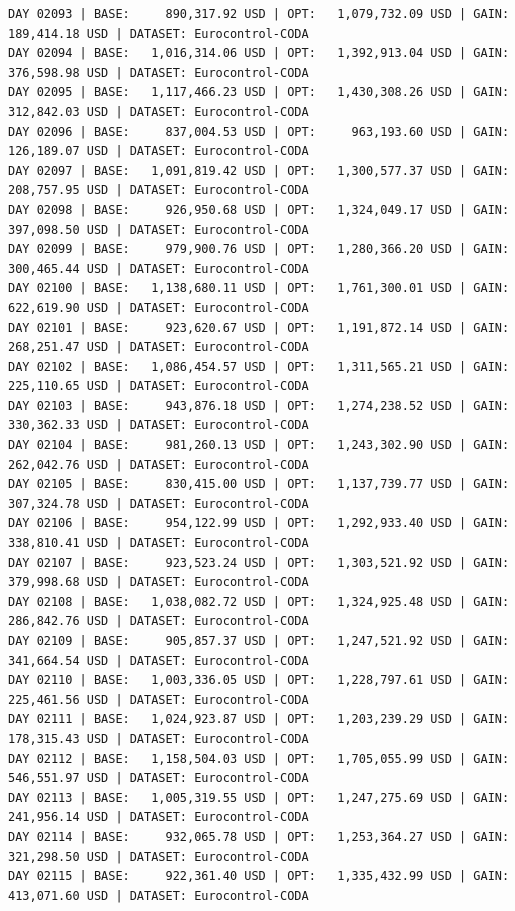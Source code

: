 \documentclass[11pt,a4paper]{article}
\begin{document}
\begin{verbatim}
DAY 02093 | BASE:     890,317.92 USD | OPT:   1,079,732.09 USD | GAIN: 189,414.18 USD | DATASET: Eurocontrol-CODA
DAY 02094 | BASE:   1,016,314.06 USD | OPT:   1,392,913.04 USD | GAIN: 376,598.98 USD | DATASET: Eurocontrol-CODA
DAY 02095 | BASE:   1,117,466.23 USD | OPT:   1,430,308.26 USD | GAIN: 312,842.03 USD | DATASET: Eurocontrol-CODA
DAY 02096 | BASE:     837,004.53 USD | OPT:     963,193.60 USD | GAIN: 126,189.07 USD | DATASET: Eurocontrol-CODA
DAY 02097 | BASE:   1,091,819.42 USD | OPT:   1,300,577.37 USD | GAIN: 208,757.95 USD | DATASET: Eurocontrol-CODA
DAY 02098 | BASE:     926,950.68 USD | OPT:   1,324,049.17 USD | GAIN: 397,098.50 USD | DATASET: Eurocontrol-CODA
DAY 02099 | BASE:     979,900.76 USD | OPT:   1,280,366.20 USD | GAIN: 300,465.44 USD | DATASET: Eurocontrol-CODA
DAY 02100 | BASE:   1,138,680.11 USD | OPT:   1,761,300.01 USD | GAIN: 622,619.90 USD | DATASET: Eurocontrol-CODA
DAY 02101 | BASE:     923,620.67 USD | OPT:   1,191,872.14 USD | GAIN: 268,251.47 USD | DATASET: Eurocontrol-CODA
DAY 02102 | BASE:   1,086,454.57 USD | OPT:   1,311,565.21 USD | GAIN: 225,110.65 USD | DATASET: Eurocontrol-CODA
DAY 02103 | BASE:     943,876.18 USD | OPT:   1,274,238.52 USD | GAIN: 330,362.33 USD | DATASET: Eurocontrol-CODA
DAY 02104 | BASE:     981,260.13 USD | OPT:   1,243,302.90 USD | GAIN: 262,042.76 USD | DATASET: Eurocontrol-CODA
DAY 02105 | BASE:     830,415.00 USD | OPT:   1,137,739.77 USD | GAIN: 307,324.78 USD | DATASET: Eurocontrol-CODA
DAY 02106 | BASE:     954,122.99 USD | OPT:   1,292,933.40 USD | GAIN: 338,810.41 USD | DATASET: Eurocontrol-CODA
DAY 02107 | BASE:     923,523.24 USD | OPT:   1,303,521.92 USD | GAIN: 379,998.68 USD | DATASET: Eurocontrol-CODA
DAY 02108 | BASE:   1,038,082.72 USD | OPT:   1,324,925.48 USD | GAIN: 286,842.76 USD | DATASET: Eurocontrol-CODA
DAY 02109 | BASE:     905,857.37 USD | OPT:   1,247,521.92 USD | GAIN: 341,664.54 USD | DATASET: Eurocontrol-CODA
DAY 02110 | BASE:   1,003,336.05 USD | OPT:   1,228,797.61 USD | GAIN: 225,461.56 USD | DATASET: Eurocontrol-CODA
DAY 02111 | BASE:   1,024,923.87 USD | OPT:   1,203,239.29 USD | GAIN: 178,315.43 USD | DATASET: Eurocontrol-CODA
DAY 02112 | BASE:   1,158,504.03 USD | OPT:   1,705,055.99 USD | GAIN: 546,551.97 USD | DATASET: Eurocontrol-CODA
DAY 02113 | BASE:   1,005,319.55 USD | OPT:   1,247,275.69 USD | GAIN: 241,956.14 USD | DATASET: Eurocontrol-CODA
DAY 02114 | BASE:     932,065.78 USD | OPT:   1,253,364.27 USD | GAIN: 321,298.50 USD | DATASET: Eurocontrol-CODA
DAY 02115 | BASE:     922,361.40 USD | OPT:   1,335,432.99 USD | GAIN: 413,071.60 USD | DATASET: Eurocontrol-CODA

\end{verbatim}
\end{document}
